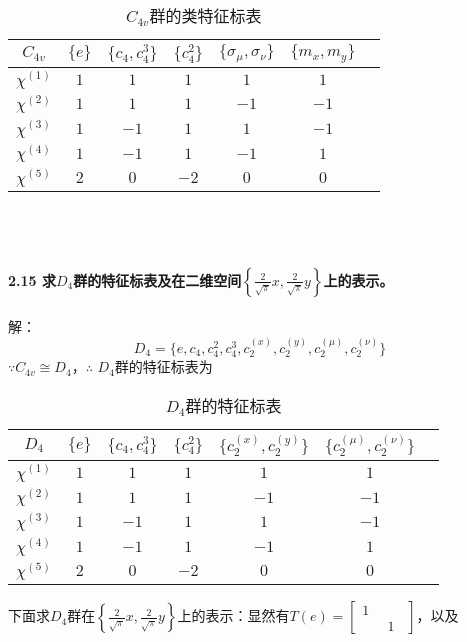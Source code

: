 \documentclass[12pt]{article}
\numberwithin{equation}{section}	 %
\begin{document}
\begin{spacing}{1.5}
\begin{longtable}{c|cccccc}
\caption{$C_{4v}$群的类特征标表}\\
	$C_{4v}$ & $\{e\}$ & $\{c_{4},c_{4}^{3}\}$ & $\{c_{4}^{2}\}$ & $\{\sigma_{\mu},\sigma_{\nu}\}$ & $\{m_{x},m_{y}\}$ \\
	\hline
	$\chi^{(1)}$ & $1$ & $1$ & $1$ & $1$ & $1$ \\
	$\chi^{(2)}$ & $1$ & $1$ & $1$ & $-1$ & $-1$ \\
	$\chi^{(3)}$ & $1$ & $-1$ & $1$ & $1$ & $-1$ \\
	$\chi^{(4)}$ & $1$ & $-1$ & $1$ & $-1$ & $1$ \\
	$\chi^{(5)}$ & $2$ & $0$ & $-2$ & $0$ & $0$ \\
\end{longtable}
~\\
~\\
~\\
\textbf{2.15 \quad 求$D_{4}$群的特征标表及在二维空间$\displaystyle \left\{\frac{2}{\sqrt{\pi}}x , \frac{2}{\sqrt{\pi}}y\right\}$上的表示。}\\
~\\
解：
\begin{equation}
D_{4} = \{e, c_{4}, c_{4}^{2}, c_{4}^{3}, c_{2}^{(x)}, c_{2}^{(y)}, c_{2}^{(\mu)}, c_{2}^{(\nu)}\}
\end{equation}
$\because C_{4v} \cong D_{4}$，$\therefore$ $D_{4}$群的特征标表为 \\
\begin{longtable}{c|cccccc}
\caption{$D_{4}$群的特征标表}\\
	$D_{4}$ & $\{e\}$ & $\{c_{4},c_{4}^{3}\}$ & $\{c_{4}^{2}\}$ & $\{c_{2}^{(x)}, c_{2}^{(y)}\}$ & $\{c_{2}^{(\mu)}, c_{2}^{(\nu)}\}$ \\
	\hline
	$\chi^{(1)}$ & $1$ & $1$ & $1$ & $1$ & $1$ \\
	$\chi^{(2)}$ & $1$ & $1$ & $1$ & $-1$ & $-1$ \\
	$\chi^{(3)}$ & $1$ & $-1$ & $1$ & $1$ & $-1$ \\
	$\chi^{(4)}$ & $1$ & $-1$ & $1$ & $-1$ & $1$ \\
	$\chi^{(5)}$ & $2$ & $0$ & $-2$ & $0$ & $0$ \\
\end{longtable}
下面求$D_{4}$群在$\displaystyle \left\{\frac{2}{\sqrt{\pi}}x , \frac{2}{\sqrt{\pi}}y\right\}$上的表示：显然有$T(e) = \begin{bmatrix} 1 & \quad \\ \quad & 1 \end{bmatrix}$，以及

\end{spacing}
\end{document}

